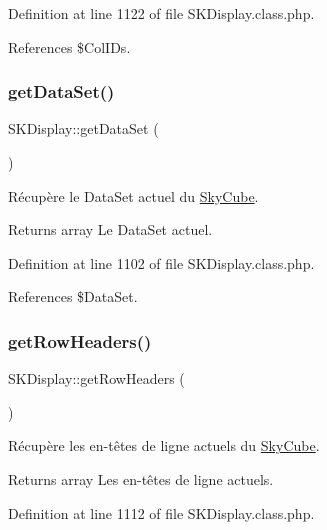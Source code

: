 Definition at line 1122 of file S\+K\+Display.\+class.\+php.



References \$\+Col\+I\+Ds.

\mbox{\label{class_s_k_display_af83a05d9139b8c80a0fc690f4bbd6c64}} 
\subsubsection{\texorpdfstring{get\+Data\+Set()}{getDataSet()}}
{\footnotesize\ttfamily S\+K\+Display\+::get\+Data\+Set (\begin{DoxyParamCaption}{ }\end{DoxyParamCaption})}

Récupère le Data\+Set actuel du \hyperlink{class_sky_cube}{Sky\+Cube}.

\begin{DoxyReturn}{Returns}
array Le Data\+Set actuel. 
\end{DoxyReturn}


Definition at line 1102 of file S\+K\+Display.\+class.\+php.



References \$\+Data\+Set.

\mbox{\label{class_s_k_display_a613ccad3378b8f9d3f7b8032ba7ab66d}} 
\subsubsection{\texorpdfstring{get\+Row\+Headers()}{getRowHeaders()}}
{\footnotesize\ttfamily S\+K\+Display\+::get\+Row\+Headers (\begin{DoxyParamCaption}{ }\end{DoxyParamCaption})}

Récupère les en-\/têtes de ligne actuels du \hyperlink{class_sky_cube}{Sky\+Cube}.

\begin{DoxyReturn}{Returns}
array Les en-\/têtes de ligne actuels. 
\end{DoxyReturn}


Definition at line 1112 of file S\+K\+Display.\+class.\+php.



